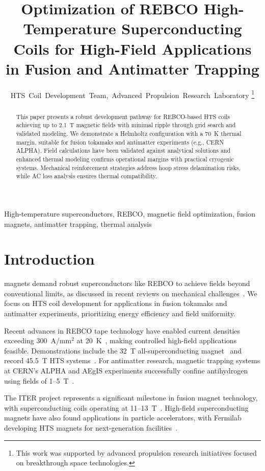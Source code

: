 \documentclass[journal]{IEEEtran}
\title{Optimization of REBCO High-Temperature Superconducting Coils for High-Field Applications in Fusion and Antimatter Trapping}
\author{HTS~Coil~Development~Team,~Advanced~Propulsion~Research~Laboratory%
\thanks{This work was supported by advanced propulsion research initiatives focused on breakthrough space technologies.}%
}
\begin{document}
\maketitle

\begin{abstract}
This paper presents a robust development pathway for REBCO-based HTS coils achieving up to 2.1~T magnetic fields with minimal ripple through grid search and validated modeling. We demonstrate a Helmholtz configuration with a 70~K thermal margin, suitable for fusion tokamaks and antimatter experiments (e.g., CERN ALPHA). Field calculations have been validated against analytical solutions and enhanced thermal modeling confirms operational margins with practical cryogenic systems. Mechanical reinforcement strategies address hoop stress delamination risks, while AC loss analysis ensures thermal compatibility.
\end{abstract}

\begin{IEEEkeywords}
High-temperature superconductors, REBCO, magnetic field optimization, fusion magnets, antimatter trapping, thermal analysis
\end{IEEEkeywords}

\section{Introduction}
 magnets demand robust superconductors like REBCO to achieve fields beyond conventional limits, as discussed in recent reviews on mechanical challenges~\cite{zhou2023}. We focus on HTS coil development for applications in fusion tokamaks and antimatter experiments, prioritizing energy efficiency and field uniformity.

Recent advances in REBCO tape technology have enabled current densities exceeding 300~A/mm$^2$ at 20~K~\cite{superpower2022,superpower2023}, making controlled high-field applications feasible. Demonstrations include the 32~T all-superconducting magnet~\cite{zhai2020} and record 45.5~T HTS systems~\cite{hahn2019}. For antimatter research, magnetic trapping systems at CERN's ALPHA and AEgIS experiments successfully confine antihydrogen using fields of 1--5~T~\cite{alpha2023,cern_alpha2022,aegis2018}.

The ITER project represents a significant milestone in fusion magnet technology, with superconducting coils operating at 11--13~T~\cite{iter2019}. High-field superconducting magnets have also found applications in particle accelerators, with Fermilab developing HTS magnets for next-generation facilities~\cite{fermilab2020}.
\end{document}

